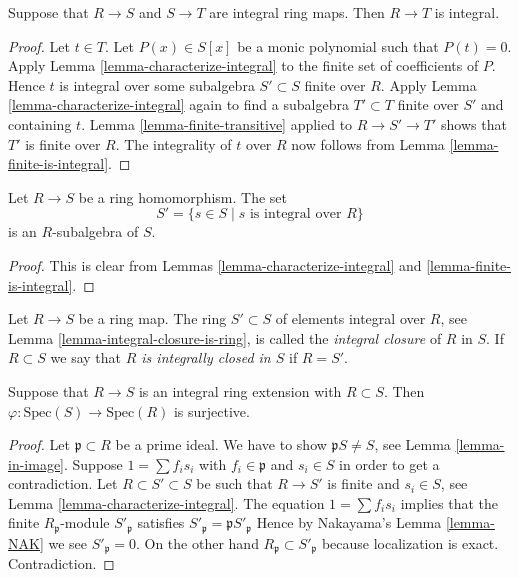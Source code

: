 \begin{lemma}
\label{lemma-integral-transitive}
Suppose that $R \to S$ and $S \to T$ are integral
ring maps. Then $R \to T$ is integral.
\end{lemma}

\begin{proof}
Let $t \in T$. Let $P(x) \in S[x]$ be a
monic polynomial such that $P(t) = 0$.
Apply Lemma \ref{lemma-characterize-integral}
to the finite set of coefficients of $P$.
Hence $t$ is integral over some subalgebra
$S' \subset S$ finite over $R$. Apply Lemma
\ref{lemma-characterize-integral} again to find
a subalgebra $T' \subset T$ finite over $S'$ and
containing $t$. Lemma \ref{lemma-finite-transitive}
applied to $R \to S' \to T'$ shows that $T'$ is finite
over $R$. The integrality of $t$ over $R$
now follows from Lemma \ref{lemma-finite-is-integral}.
\end{proof}

\begin{lemma}
\label{lemma-integral-closure-is-ring}
Let $R \to S$ be a ring homomorphism.
The set
$$
S' = \{s \in S \mid s\text{ is integral over }R\}
$$
is an $R$-subalgebra of $S$.
\end{lemma}

\begin{proof}
This is clear from Lemmas \ref{lemma-characterize-integral}
and \ref{lemma-finite-is-integral}.
\end{proof}

\begin{definition}
\label{definition-integral-closure}
Let $R \to S$ be a ring map. 
The ring $S' \subset S$ of elements integral over
$R$, see Lemma \ref{lemma-integral-closure-is-ring},
is called the {\it integral closure} of $R$
in $S$. If $R \subset S$ we say that {\it $R$ is
integrally closed in $S$} if $R = S'$.
\end{definition}

\begin{lemma}
\label{lemma-integral-overring-surjective}
Suppose that $R \to S$ is an integral
ring extension with $R \subset S$.
Then $\varphi : \text{Spec}(S) \to \text{Spec}(R)$
is surjective.
\end{lemma}

\begin{proof}
Let $\mathfrak p \subset R$ be a prime ideal.
We have to show $\mathfrak pS \not = S$, see Lemma \ref{lemma-in-image}.
Suppose $1 = \sum f_i s_i$ with $f_i \in \mathfrak p$
and $s_i \in S$ in order to get a contradiction.
Let $R \subset S' \subset S$
be such that $R\to S'$ is finite and $s_i \in S$,
see Lemma \ref{lemma-characterize-integral}.
The equation $1 = \sum f_i s_i$ implies that
the finite $R_{\mathfrak p}$-module 
$S'_{\mathfrak p}$ satisfies
$S'_{\mathfrak p} = \mathfrak pS'_{\mathfrak p}$
Hence by Nakayama's Lemma \ref{lemma-NAK}
we see $S'_{\mathfrak p} = 0$. On the other hand
$R_{\mathfrak p} \subset S'_{\mathfrak p}$ because localization
is exact. Contradiction.
\end{proof}

